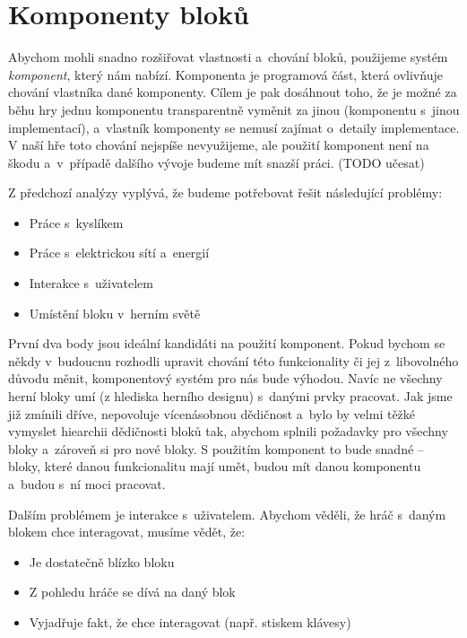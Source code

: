 


\section{Komponenty bloků}

Abychom mohli snadno rozšiřovat vlastnosti a~chování bloků, použijeme systém \textit{komponent}, který nám \UE{} nabízí. Komponenta je programová část, která ovlivňuje chování vlastníka dané komponenty. Cílem je pak dosáhnout toho, že je možné za běhu hry jednu komponentu transparentně vyměnit za jinou (komponentu s~jinou implementací), a~vlastník komponenty se nemusí zajímat o~detaily implementace. V naší hře toto chování nejspíše nevyužijeme, ale použití komponent není na škodu a~v~případě dalšího vývoje budeme mít snazší práci. (TODO učesat)

Z předchozí analýzy vyplývá, že budeme potřebovat řešit následující problémy:

\begin{itemize}
	\item Práce s~kyslíkem
	\item Práce s~elektrickou sítí a~energií
	\item Interakce s~uživatelem
	\item Umístění bloku v~herním světě
\end{itemize}


První dva body jsou ideální kandidáti na použití komponent. Pokud bychom se někdy v~budoucnu rozhodli upravit chování této funkcionality či jej z~libovolného důvodu měnit, komponentový systém pro nás bude výhodou. Navíc ne všechny herní bloky umí (z hlediska herního designu) s~danými prvky pracovat. Jak jsme již zmínili dříve, \UE{} nepovoluje vícenásobnou dědičnost a~bylo by velmi těžké vymyslet hiearchii dědičnosti bloků tak, abychom splnili požadavky pro všechny bloky a~zároveň si  pro nové bloky. S použitím komponent to bude snadné -- bloky, které danou funkcionalitu mají umět, budou mít danou komponentu a~budou s~ní moci pracovat.

Dalším problémem je interakce s~uživatelem. Abychom věděli, že hráč s~daným blokem chce interagovat, musíme vědět, že:
\begin{itemize}
	\item Je dostatečně blízko bloku
	\item Z pohledu hráče se dívá na daný blok 
	\item Vyjadřuje fakt, že chce interagovat (např. stiskem klávesy)
\end{itemize}


